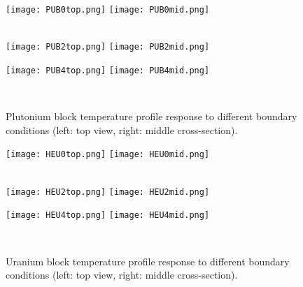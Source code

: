 \documentclass{anstrans}
\begin{document}
\begin{figure}[ht] 
	\centering
	\vspace*{-1em}\texttt{[image: PUB0top.png]}
	\enskip \texttt{[image: PUB0mid.png]}\vspace*{-0.15cm}
	
	\raggedright	
	\quad {} \\
	
	\centering
	\texttt{[image: PUB2top.png]}
	\enskip \texttt{[image: PUB2mid.png]}\vspace*{-0.15cm}
	
	\raggedright
	\quad  {} 
	
	\centering
	\texttt{[image: PUB4top.png]}
	\enskip \texttt{[image: PUB4mid.png]} \vspace*{-0.15cm}
	
	\raggedright
	\quad {} \\
	
	\vspace*{0.15cm} \caption{Plutonium block temperature profile response to different boundary conditions (left: top view,  right: middle cross-section).}
	\label{fig:PU_Temp}	
\end{figure}

\begin{figure}[ht] 
	\centering
	\vspace*{-1em}\texttt{[image: HEU0top.png]}
	\enskip \texttt{[image: HEU0mid.png]}\vspace*{-0.2cm}
		
	\raggedright	
	\quad {} \\
	
	\centering
	\texttt{[image: HEU2top.png]}
	\enskip \texttt{[image: HEU2mid.png]}\vspace*{-0.2cm}
	
	\raggedright
	\quad  {} 
	
	\centering
	\texttt{[image: HEU4top.png]}
	\enskip \texttt{[image: HEU4mid.png]}\vspace*{-0.15cm}
	
	\raggedright
	\quad {} \\
	
	\vspace*{0.15cm} \caption{Uranium block temperature profile response to different boundary conditions (left: top view,  right: middle cross-section).}
	\label{fig:HEU_Temp}	
\end{figure}
\end{document}
